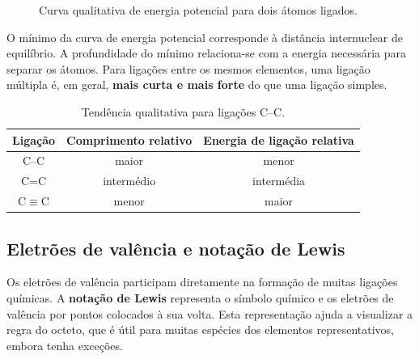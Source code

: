 \documentclass[11pt,a4paper,oneside]{book}
\begin{document}
\begin{figure}[H]
\centering
{}
\caption{Curva qualitativa de energia potencial para dois átomos ligados.}
\end{figure}
O mínimo da curva de energia potencial corresponde à distância internuclear de equilíbrio. A profundidade do mínimo relaciona-se com a energia necessária para separar os átomos. Para ligações entre os mesmos elementos, uma ligação múltipla é, em geral, \textbf{mais curta e mais forte} do que uma ligação simples.

\begin{table}[H]
\centering
\caption{Tendência qualitativa para ligações C--C.}
\begin{tabular}{ccc}
\toprule
Ligação & Comprimento relativo & Energia de ligação relativa \\
\midrule
C--C & maior & menor \\
C=C & intermédio & intermédia \\
C$\equiv$C & menor & maior \\
\bottomrule
\end{tabular}
\end{table}


\subsection*{Eletrões de valência e notação de Lewis}
Os eletrões de valência participam diretamente na formação de muitas ligações químicas. A \textbf{notação de Lewis} representa o símbolo químico e os eletrões de valência por pontos colocados à sua volta. Esta representação ajuda a visualizar a regra do octeto, que é útil para muitas espécies dos elementos representativos, embora tenha exceções.
\end{document}

